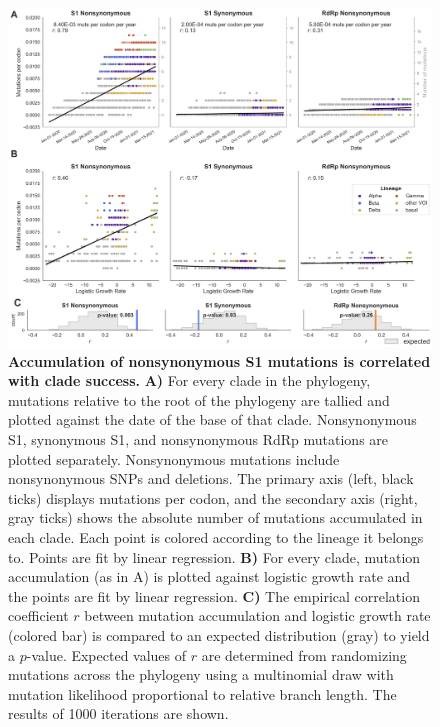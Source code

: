 \documentclass[11pt,oneside,letterpaper]{article}
\begin{document}
\begin{figure}[h!]
	\centerline{\includegraphics[width=1.0\textwidth]{fig1_mutaccumulation.png}}
	\caption{\textbf{Accumulation of nonsynonymous S1 mutations is correlated with clade success.}
	\textbf{A)} For every clade in the phylogeny, mutations relative to the root of the phylogeny are tallied and plotted against the date of the base of that clade.
	Nonsynonymous S1, synonymous S1, and nonsynonymous RdRp mutations are plotted separately.
	Nonsynonymous mutations include nonsynonymous SNPs and deletions.
	The primary axis (left, black ticks) displays mutations per codon, and the secondary axis (right, gray ticks) shows the absolute number of mutations accumulated in each clade.
	Each point is colored according to the lineage it belongs to.
	Points are fit by linear regression.
	\textbf{B)} For every clade, mutation accumulation (as in A) is plotted against logistic growth rate and the points are fit by linear regression.
	\textbf{C)} The empirical correlation coefficient $r$ between mutation accumulation and logistic growth rate (colored bar) is compared to an expected distribution (gray) to yield a $p$-value.
	Expected values of $r$ are determined from randomizing mutations across the phylogeny using a multinomial draw with mutation likelihood proportional to relative branch length.
	The results of 1000 iterations are shown.
	}
	\label{fig:mutaccumulation}
\end{figure}
\end{document}
